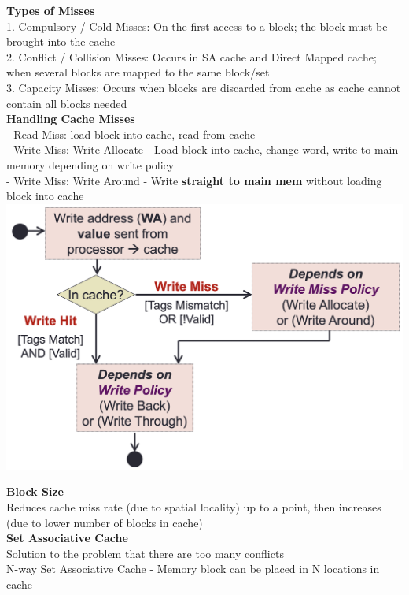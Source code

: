 \documentclass[10pt, a4paper]{article}
\newcommand{\highlight}[1]{{\color{red}\textbf{#1}}}
\newcommand{\blue}[1]{{\color{MidnightBlue}#1}}
\begin{document}
\begin{multicols*}{3}
		\textbf{Types of Misses}\\
		1. \blue{Compulsory / Cold Misses}: On the first access to a block; the block must be brought into the cache\\
		2. \blue{Conflict / Collision Misses}: Occurs in SA cache and Direct Mapped cache; when several blocks are mapped to the same block/set\\
		3. \blue{Capacity Misses}: Occurs when blocks are discarded from cache as cache cannot contain all blocks needed\\
		\textbf{Handling Cache Misses}\\
		- \blue{Read Miss}: load block into cache, read from cache\\
		- \blue{Write Miss}: Write Allocate - Load block into cache, change word, write to main memory depending on write policy\\
		- \blue{Write Miss}: Write Around - Write \highlight{straight to main mem} without loading block into cache\\
		\includegraphics[scale=.22]{./assets/writeDataCache}

		\textbf{Block Size}\\
		Reduces cache miss rate (due to spatial locality) up to a point, then increases (due to lower number of blocks in cache)\\

		\textbf{Set Associative Cache}\\
		Solution to the problem that there are too many conflicts\\
		\blue{N-way Set Associative Cache} - Memory block can be placed in N locations in cache\\


\end{multicols*}
\end{document}
